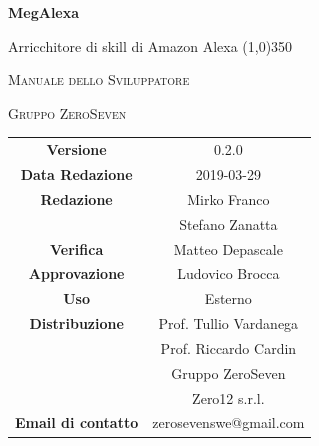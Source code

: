 \documentclass[a4paper,12pt,openany]{book}
\author{Ludovico Brocca}
\date{2018-12-19}
\begin{document}
\begin{titlepage}
	\centering
	{\huge\bfseries MegAlexa \par}
	Arricchitore di skill di Amazon Alexa
	\line(1,0){350} \\
	{\scshape\LARGE Manuale dello Sviluppatore \par}
	\vspace{1cm}
	{\scshape Gruppo ZeroSeven \par}
	\logo
	\begin{tabular}{c|c}
		{\hfill \textbf{Versione}} 			& 0.2.0	\\
		{\hfill\textbf{Data Redazione}} 	& 2019-03-29	\\ 
		{\hfill\textbf{Redazione}} 			&  		Mirko Franco \\ & Stefano Zanatta \\
		{\hfill\textbf{Verifica}} 				&  	Matteo Depascale \\
		{\hfill\textbf{Approvazione}} 		&  	Ludovico Brocca \\
		{\hfill\textbf{Uso}} 					& 		Esterno		\\ 
		{\hfill\textbf{Distribuzione}} 			& 			Prof. Tullio Vardanega \\ & Prof. Riccardo Cardin \\ & Gruppo ZeroSeven	\\ & Zero12 s.r.l. \\
		{\hfill\textbf{Email di contatto}} & zerosevenswe@gmail.com \\
	\end{tabular}
\end{titlepage}
	
	\label{LastFrontPage}
	\newpage	
	
	\pagestyle{mymain}
	\tableofcontents
	\listoffigures
	\listoftables
	
	
	
	
	
	
	\label{LastPage}
\end{document}
